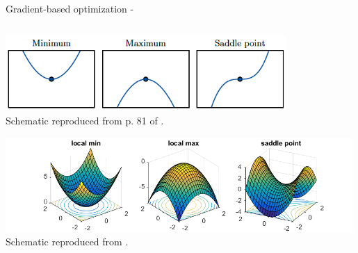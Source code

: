 \begin{frame}[t,allowframebreaks]{Gradient-based optimization -}
\begin{columns}
\begin{column}{0.68\textwidth}
            \begin{center}
                \includegraphics[width=0.80\textwidth]
                    {./images/grad_descent/goodfellow17_min_max_saddle_1d.png}\\
                {\tiny 
                    \color{col:attribution} 
                    Schematic reproduced from p. 81 of \cite{Goodfellow:2017MITDL}.\\
                }

                \vspace{0.6cm}

                \includegraphics[width=0.99\textwidth]
                    {./images/grad_descent/ge16_min_max_saddle_2d.png}\\
                {\tiny 
                    \color{col:attribution} 
                    Schematic reproduced from \cite{OffConvex:EscapingSaddlePoints}.\\
                }
            \end{center}        
        
        \end{column}
    \end{columns}

\end{frame}


